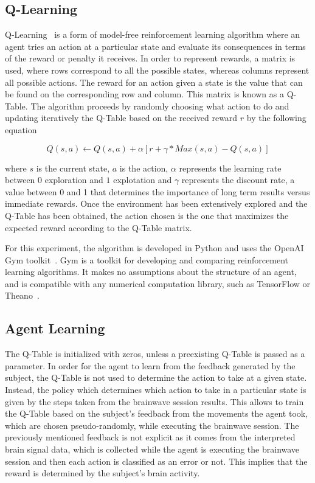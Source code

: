 \documentclass[journal]{IEEEtran}
\begin{document}
{\subsection{Q-Learning}{
\label{q_learning_step}

Q-Learning~\cite{Watkins1992} is a form of model-free reinforcement learning algorithm where an agent tries an action at a particular state and evaluate its consequences in terms of the reward or penalty it receives.  In order to represent rewards, a matrix is used, where rows correspond to all the possible states, whereas columns represent all possible actions.  The reward for an action given a state is the value that can be found on the corresponding row and column.  This matrix is known as a Q-Table.  The algorithm proceeds by randomly choosing what action to do and updating iteratively the Q-Table based on the received reward $r$ by the following equation

\begin{equation}
    Q(s,a) \leftarrow Q(s,a) + \alpha[r+\gamma* Max(s, a)-Q(s, a) ]
    \label{equ:update_q_table}
\end{equation}

\noindent where $s$ is the current state, $a$ is the action, $\alpha$ represents the learning rate between $0$ exploration and $1$ explotation and $\gamma$ represents the discount rate, a value between 0 and 1 that determines the importance of long term results versus immediate rewards.  Once the environment has been extensively explored and the Q-Table has been obtained, the action chosen is the one that maximizes the expected reward according to the Q-Table matrix.

For this experiment, the algorithm is developed in Python and uses the OpenAI Gym toolkit~\cite{openai}. Gym is a toolkit for developing and comparing reinforcement learning algorithms. It makes no assumptions about the structure of an agent, and is compatible with any numerical computation library, such as TensorFlow or Theano~\cite{tensorflow2015-whitepaper}.

\subsection{Agent Learning}
\label{q_learning_step_alg}
The Q-Table is initialized with zeros, unless a preexisting Q-Table is passed as a parameter. In order for the agent to learn from the feedback generated by the subject, the Q-Table is not used to determine the action to take at a given state. Instead, the policy which determines which action to take in a particular state is given by the steps taken from the brainwave session results. This allows to train the Q-Table based on the subject's feedback from the movements the agent took, which are chosen pseudo-randomly, while executing the brainwave session. The previously mentioned feedback is not explicit as it comes from the interpreted brain signal data, which is collected while the agent is executing the brainwave session and then each action is classified as an error or not. This implies that the reward is determined by the subject's brain activity. 

}}
\end{document}
